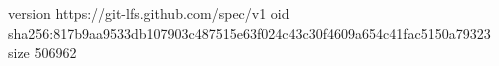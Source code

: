 version https://git-lfs.github.com/spec/v1
oid sha256:817b9aa9533db107903c487515e63f024c43c30f4609a654c41fac5150a79323
size 506962
